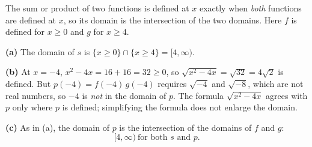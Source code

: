 The sum or product of two functions is defined at $x$ exactly when \emph{both} functions are defined at $x$, so its domain is the intersection of the two domains. Here $f$ is defined for $x\ge0$ and $g$ for $x\ge4$.

\textbf{(a)} The domain of $s$ is $\{x\ge0\}\cap\{x\ge4\}=[4,\infty)$.

\textbf{(b)} At $x=-4$, $x^2-4x=16+16=32\ge0$, so $\sqrt{x^2-4x}=\sqrt{32}=4\sqrt2$ is defined. But $p(-4)=f(-4)\,g(-4)$ requires $\sqrt{-4}$ and $\sqrt{-8}$, which are not real numbers, so $-4$ is \emph{not} in the domain of $p$. The formula $\sqrt{x^2-4x}$ agrees with $p$ only where $p$ is defined; simplifying the formula does not enlarge the domain.

\textbf{(c)} As in (a), the domain of $p$ is the intersection of the domains of $f$ and $g$:
\[
\boxed{[4,\infty)}\ \text{for both } s \text{ and } p.
\]

